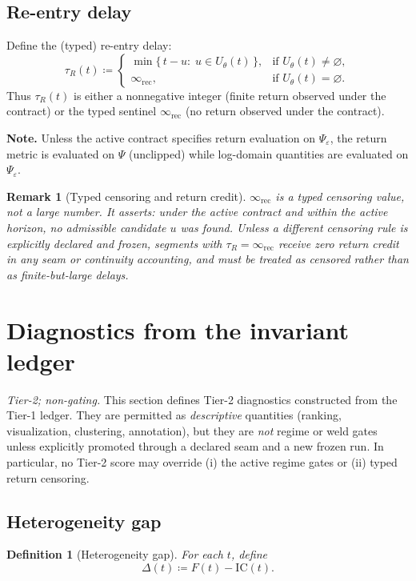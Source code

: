 \documentclass[
  aps,
  prd,
  preprint,
  superscriptaddress,
  nofootinbib,
  floatfix
]{revtex4-2}
\newcommand{\Rinf}{\infty_{\mathrm{rec}}}
\newcommand{\IC}{\mathrm{IC}}
\newtheorem{definition}[theorem]{Definition}
\newtheorem{remark}{Remark}
\begin{document}
\subsection{Re-entry delay}
Define the (typed) re-entry delay:
\begin{equation}
  \tau_R(t) \coloneqq
  \begin{cases}
    \min\{\,t-u:\; u\in U_\theta(t)\,\}, & \text{if } U_\theta(t)\neq\varnothing,\\[0.35em]
    \Rinf, & \text{if } U_\theta(t)=\varnothing.
  \end{cases}
\end{equation}
Thus $\tau_R(t)$ is either a nonnegative integer (finite return observed under the contract) or the typed sentinel
$\Rinf$ (no return observed under the contract).\par
\noindent\textbf{Note.} Unless the active contract specifies return evaluation on $\Psi_\varepsilon$,
the return metric is evaluated on $\Psi$ (unclipped) while log-domain quantities are evaluated on $\Psi_\varepsilon$.
\begin{remark}[Typed censoring and return credit]
\label{rem:typed_censoring}
$\Rinf$ is a typed censoring value, not a large number. It asserts:
\emph{under the active contract and within the active horizon, no admissible candidate $u$ was found.}
Unless a different censoring rule is explicitly declared and frozen, segments with $\tau_R=\Rinf$ receive zero return credit
in any seam or continuity accounting, and must be treated as censored rather than as finite-but-large delays.
\end{remark}

\section{Diagnostics from the invariant ledger}
\label{sec:diagnostics}

\noindent\textit{Tier-2; non-gating.}
This section defines Tier-2 diagnostics constructed from the Tier-1 ledger.
They are permitted as \emph{descriptive} quantities (ranking, visualization, clustering, annotation),
but they are \emph{not} regime or weld gates unless explicitly promoted through a declared seam and a new frozen run.
In particular, no Tier-2 score may override (i) the active regime gates or (ii) typed return censoring.

\subsection{Heterogeneity gap}
\begin{definition}[Heterogeneity gap]
\label{def:delta}
For each $t$, define
\begin{equation}
  \Delta(t) \coloneqq F(t) - \IC(t).
\end{equation}
\end{definition}
\end{document}
